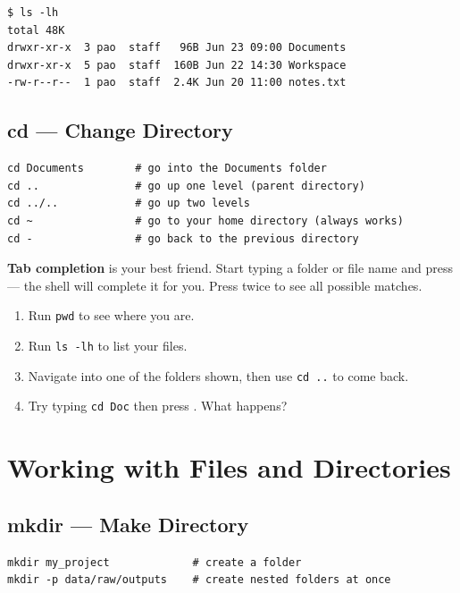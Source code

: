 \documentclass[12pt,a4paper]{article}
\newcommand{\tip}[1]{%
  \begin{tcolorbox}[tipstyle]
    #1
  \end{tcolorbox}
}
\newcommand{\exercise}[1]{%
  \begin{tcolorbox}[exercisestyle]
    #1
  \end{tcolorbox}
}
\newcommand{\cmd}[1]{\texttt{\textcolor{kugreen!70!black}{#1}}}
\newcommand{\key}[1]{\fbox{\small\ttfamily #1}}
\begin{document}
\begin{lstlisting}[style=terminal]
$ ls -lh
total 48K
drwxr-xr-x  3 pao  staff   96B Jun 23 09:00 Documents
drwxr-xr-x  5 pao  staff  160B Jun 22 14:30 Workspace
-rw-r--r--  1 pao  staff  2.4K Jun 20 11:00 notes.txt
\end{lstlisting}

\subsection{cd --- Change Directory}

\begin{lstlisting}[style=bash]
cd Documents        # go into the Documents folder
cd ..               # go up one level (parent directory)
cd ../..            # go up two levels
cd ~                # go to your home directory (always works)
cd -                # go back to the previous directory
\end{lstlisting}

\tip{
  \textbf{Tab completion} is your best friend. Start typing a folder or file
  name and press \key{Tab} --- the shell will complete it for you. Press
  \key{Tab} twice to see all possible matches.
}

\exercise{
  \begin{enumerate}[noitemsep]
    \item Run \cmd{pwd} to see where you are.
    \item Run \cmd{ls -lh} to list your files.
    \item Navigate into one of the folders shown, then use \cmd{cd ..} to come back.
    \item Try typing \texttt{cd Doc} then press \key{Tab}. What happens?
  \end{enumerate}
}

\section{Working with Files and Directories}

\subsection{mkdir --- Make Directory}

\begin{lstlisting}[style=bash]
mkdir my_project             # create a folder
mkdir -p data/raw/outputs    # create nested folders at once
\end{lstlisting}
\end{document}
